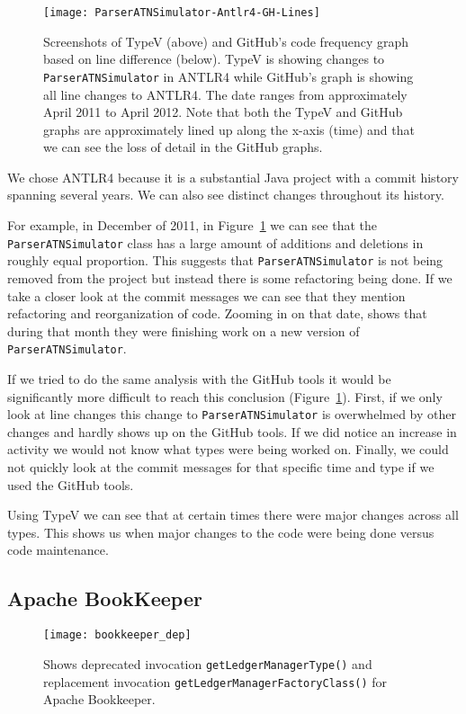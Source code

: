 \begin{figure}[!ht]
\centering
\texttt{[image: ParserATNSimulator-Antlr4-GH-Lines]}
\caption{Screenshots of TypeV (above) and GitHub's code frequency graph based on line difference (below). TypeV is showing changes to \texttt{ParserATNSimulator} in ANTLR4 while GitHub's graph is showing all line changes to ANTLR4. The date ranges from approximately April 2011 to April 2012. Note that both the TypeV and GitHub graphs are approximately lined up along the x-axis (time) and that we can see the loss of detail in the GitHub graphs.}
\label{fig:parser}
\end{figure}


We chose ANTLR4 because it is a substantial Java project with a commit history spanning several years. We can also see distinct changes throughout its history.

For example, in December of 2011, in Figure~\ref{fig:parser} we can see that the \texttt{ParserATNSimulator} class has a large amount of additions and deletions in roughly equal proportion. This suggests that \texttt{ParserATNSimulator} is not being removed from the project but instead there is some refactoring being done. If we take a closer look at the commit messages we can see that they mention refactoring and reorganization of code. Zooming in on that date,  shows that during that month they were finishing work on a new version of \texttt{ParserATNSimulator}.

If we tried to do the same analysis with the GitHub tools it would be significantly more difficult to reach this conclusion (Figure~\ref{fig:parser}). First, if we only look at line changes this change to \texttt{ParserATNSimulator} is overwhelmed by other changes and hardly shows up on the GitHub tools. If we did notice an increase in activity we would not know what types were being worked on. Finally, we could not quickly look at the commit messages for that specific time and type if we used the GitHub tools.

Using TypeV we can see that at certain times there were major changes across all types. This shows us when major changes to the code were being done versus code maintenance.

\subsection{Apache BookKeeper}

\begin{figure}[!ht]
\centering
\texttt{[image: bookkeeper\_dep]}
\caption{Shows deprecated invocation \texttt{getLedgerManagerType()} and replacement invocation \texttt{getLedgerManagerFactoryClass()} for Apache Bookkeeper.}
\label{fig:bookkeeper-depr}
\end{figure}

